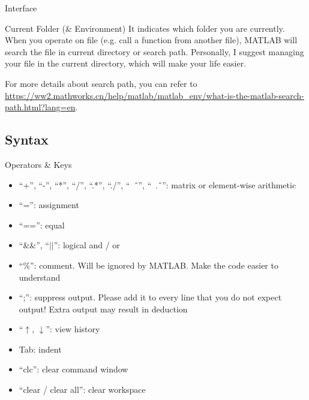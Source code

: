 \begin{frame}{Interface}
\begin{block}{Current Folder (\& Environment)}
It indicates which folder you are currently. When you operate on file (e.g. call a function from another file), MATLAB will search the file in current directory or search path. Personally, I suggest managing your file in the current directory, which will make your life easier.

For more details about search path, you can refer to \url{https://ww2.mathworks.cn/help/matlab/matlab_env/what-is-the-matlab-search-path.html?lang=en}.
\end{block}
\end{frame}

\subsection{Syntax}
\begin{frame}{Operators \& Keys}
\begin{itemize}
\item ``+'', ``-'', ``*'', ``/'', ``.*'', ``./'', ``\ \^\ '', ``\ .\^\ '': matrix or element-wise arithmetic
\item ``='': assignment
\item ``=='': equal
\item ``\&\&'', ``$||$'': logical and / or
\item ``\%'': comment. Will be ignored by MATLAB. Make the code easier to understand
\item ``;'': suppress output. Please add it to every line that you do not expect output! Extra output may result in deduction
\item ``$\uparrow$, $\downarrow$'': view history
\item Tab: indent
\item ``clc'': clear command window
\item ``clear / clear all'': clear workspace
\end{itemize}
\end{frame}

